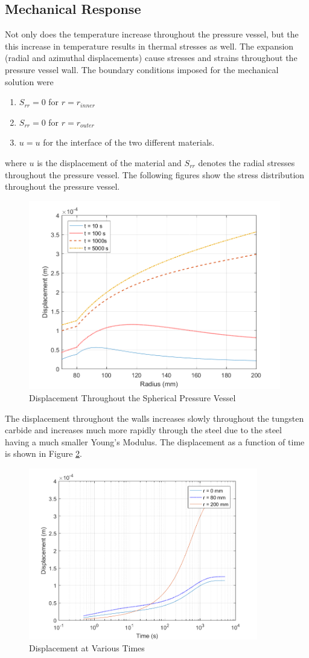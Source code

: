 \documentclass[times]{nmeauth}
\begin{document}
\subsection{Mechanical Response}
Not only does the temperature increase throughout the pressure vessel, but the this increase in temperature results in thermal stresses as well. The expansion (radial and azimuthal displacements) cause stresses and strains throughout the pressure vessel wall. The boundary conditions imposed for the mechanical solution were
\begin{enumerate}
\centering
\item $S_{rr} = 0$ for $r = r_{inner}$
\item $S_{rr} = 0$ for $r = r_{outer}$
\item $u = u$ for the interface of the two different materials.
\end{enumerate}
where $u$ is the displacement of the material and $S_{rr}$ denotes the radial stresses throughout the pressure vessel. The following figures show the stress distribution throughout the pressure vessel.
\begin{figure}[!htbp]
\centering \includegraphics[width=110mm]{Displacement}
\caption{Displacement Throughout the Spherical Pressure Vessel}\label{fig:4}
\end{figure}
The displacement throughout the walls increases slowly throughout the tungsten carbide and increases much more rapidly through the steel due to the steel having a much smaller Young's Modulus. The displacement as a function of time is shown in Figure \ref{fig:5}.
\begin{figure}[!htbp]
\centering \includegraphics[width=100mm]{Displacement_Time}
\caption{Displacement at Various Times}\label{fig:5}
\end{figure}
\end{document}
